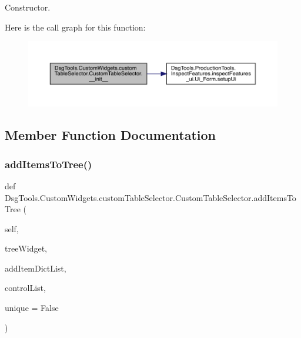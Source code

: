 \begin{DoxyVerb}Constructor.\end{DoxyVerb}
 Here is the call graph for this function\+:
\nopagebreak
\begin{figure}[H]
\begin{center}
\leavevmode
\includegraphics[width=350pt]{class_dsg_tools_1_1_custom_widgets_1_1custom_table_selector_1_1_custom_table_selector_a071325782db3af7b33ef5d7c4f330ec7_cgraph}
\end{center}
\end{figure}


\subsection{Member Function Documentation}
\mbox{\label{class_dsg_tools_1_1_custom_widgets_1_1custom_table_selector_1_1_custom_table_selector_a28820966afdddb28abaa28306ff151a0}} 
\subsubsection{\texorpdfstring{add\+Items\+To\+Tree()}{addItemsToTree()}}
{\footnotesize\ttfamily def Dsg\+Tools.\+Custom\+Widgets.\+custom\+Table\+Selector.\+Custom\+Table\+Selector.\+add\+Items\+To\+Tree (\begin{DoxyParamCaption}\item[{}]{self,  }\item[{}]{tree\+Widget,  }\item[{}]{add\+Item\+Dict\+List,  }\item[{}]{control\+List,  }\item[{}]{unique = {\ttfamily False} }\end{DoxyParamCaption})}

